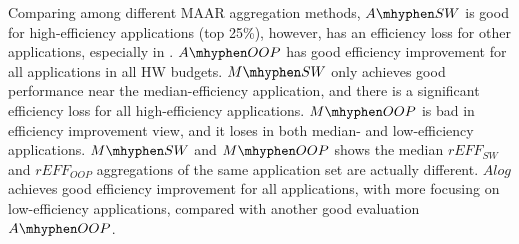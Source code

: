 


Comparing among different MAAR aggregation methods, 
$A\mhyphen SW$ is good for high-efficiency applications (top 25\%), however, has an efficiency loss for other applications, especially in .
$A\mhyphen OOP$ has good efficiency improvement for all applications in all HW budgets.
$M\mhyphen SW$ only achieves good performance near the median-efficiency application, and there is a significant efficiency loss for all high-efficiency applications. 
$M\mhyphen OOP$ is bad in efficiency improvement view, and it loses in both median- and low-efficiency applications. 
$M\mhyphen SW$ and $M\mhyphen OOP$ shows the median $rEFF_{SW}$ and $rEFF_{OOP}$ aggregations of the same application set are actually different. 
$Alog$ achieves good efficiency improvement for all applications, with more focusing on low-efficiency applications, compared with another good evaluation $A\mhyphen OOP$.